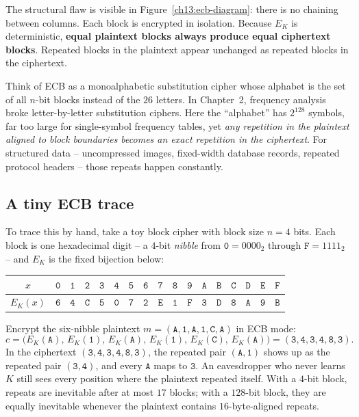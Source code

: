 The structural flaw is visible in Figure~\ref{ch13:ecb-diagram}: there is no chaining between columns. Each block is encrypted in isolation. Because $E_K$ is deterministic, \textbf{equal plaintext blocks always produce equal ciphertext blocks}. Repeated blocks in the plaintext appear unchanged as repeated blocks in the ciphertext.

\begin{intuitionbox}
Think of ECB as a monoalphabetic substitution cipher whose alphabet is the set of all $n$-bit blocks instead of the $26$ letters. In Chapter~2, frequency analysis broke letter-by-letter substitution ciphers. Here the ``alphabet'' has $2^{128}$ symbols, far too large for single-symbol frequency tables, yet \emph{any repetition in the plaintext aligned to block boundaries becomes an exact repetition in the ciphertext}. For structured data -- uncompressed images, fixed-width database records, repeated protocol headers -- those repeats happen constantly.
\end{intuitionbox}

\subsection{A tiny ECB trace}

To trace this by hand, take a toy block cipher with block size $n = 4$ bits. Each block is one hexadecimal digit -- a $4$-bit \emph{nibble} from $\mathtt{0} = 0000_2$ through $\mathtt{F} = 1111_2$ -- and $E_K$ is the fixed bijection below:

\begin{center}
\begin{tabular}{@{}c|cccccccccccccccc@{}}
\toprule
$x$ & $\mathtt{0}$ & $\mathtt{1}$ & $\mathtt{2}$ & $\mathtt{3}$ & $\mathtt{4}$ & $\mathtt{5}$ & $\mathtt{6}$ & $\mathtt{7}$ & $\mathtt{8}$ & $\mathtt{9}$ & $\mathtt{A}$ & $\mathtt{B}$ & $\mathtt{C}$ & $\mathtt{D}$ & $\mathtt{E}$ & $\mathtt{F}$\\
\midrule
$E_K(x)$ & $\mathtt{6}$ & $\mathtt{4}$ & $\mathtt{C}$ & $\mathtt{5}$ & $\mathtt{0}$ & $\mathtt{7}$ & $\mathtt{2}$ & $\mathtt{E}$ & $\mathtt{1}$ & $\mathtt{F}$ & $\mathtt{3}$ & $\mathtt{D}$ & $\mathtt{8}$ & $\mathtt{A}$ & $\mathtt{9}$ & $\mathtt{B}$\\
\bottomrule
\end{tabular}
\end{center}

Encrypt the six-nibble plaintext $m = (\mathtt{A}, \mathtt{1}, \mathtt{A}, \mathtt{1}, \mathtt{C}, \mathtt{A})$ in ECB mode:
\[
c = \big(E_K(\mathtt{A}),\, E_K(\mathtt{1}),\, E_K(\mathtt{A}),\, E_K(\mathtt{1}),\, E_K(\mathtt{C}),\, E_K(\mathtt{A})\big) = (\mathtt{3},\mathtt{4},\mathtt{3},\mathtt{4},\mathtt{8},\mathtt{3}).
\]
In the ciphertext $(\mathtt{3},\mathtt{4},\mathtt{3},\mathtt{4},\mathtt{8},\mathtt{3})$, the repeated pair $(\mathtt{A},\mathtt{1})$ shows up as the repeated pair $(\mathtt{3},\mathtt{4})$, and every $\mathtt{A}$ maps to $\mathtt{3}$. An eavesdropper who never learns $K$ still sees every position where the plaintext repeated itself. With a $4$-bit block, repeats are inevitable after at most $17$ blocks; with a $128$-bit block, they are equally inevitable whenever the plaintext contains $16$-byte-aligned repeats.

